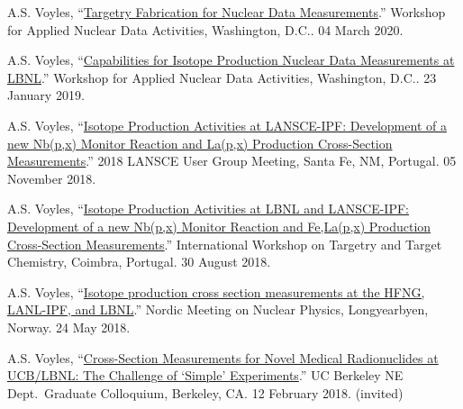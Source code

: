 \begin{bibsection}

\item A.S. Voyles, \enquote{\href{https://conferences.lbl.gov/event/292/}{Targetry Fabrication for Nuclear Data Measurements}.} Workshop for Applied Nuclear Data Activities, Washington, D.C.. 04 March 2020.

\item A.S. Voyles, \enquote{\href{https://conferences.lbl.gov/event/198/}{Capabilities for Isotope Production Nuclear Data Measurements at LBNL}.} Workshop for Applied Nuclear Data Activities, Washington, D.C.. 23 January 2019.

\item A.S. Voyles, \enquote{\href{https://lansce.lanl.gov/lug2018.php}{Isotope Production Activities at LANSCE-IPF: Development of a new Nb(p,x) Monitor Reaction and La(p,x) Production Cross-Section Measurements}.} 2018 LANSCE User Group Meeting, Santa Fe, NM, Portugal. 05 November 2018.

\item A.S. Voyles, \enquote{\href{https://slideslive.com/38910297/isotope-production-activities-at-lbnl-and-lansceipf-development-of-a-new-nbpx90mo-monitor-reaction-and-felapx-production-crosssection-measurements}{Isotope Production Activities at LBNL and LANSCE-IPF: Development of a new Nb(p,x) Monitor Reaction and Fe,La(p,x) Production Cross-Section Measurements}.}  International Workshop on Targetry and Target Chemistry, Coimbra, Portugal. 30 August 2018.


\item A.S. Voyles, \enquote{\href{https://indico.cern.ch/event/686407/contributions/2943775/}{Isotope production cross section measurements at the HFNG, LANL-IPF, and LBNL}.}    Nordic Meeting on Nuclear Physics, Longyearbyen, Norway. 24 May 2018.

\item A.S. Voyles, \enquote{\href{https://github.com/avoyles/presentations/blob/master/2018-02-12-UCBNE_colloquium/Voyles_12_Feb_2018_NE_Colloquium_Talk.pdf}{Cross-Section Measurements for Novel Medical Radionuclides at UCB/LBNL: The Challenge of \enquote{Simple} Experiments}.} UC Berkeley NE Dept.\ Graduate Colloquium, Berkeley, CA. 12 February 2018. (invited)


\end{bibsection}
